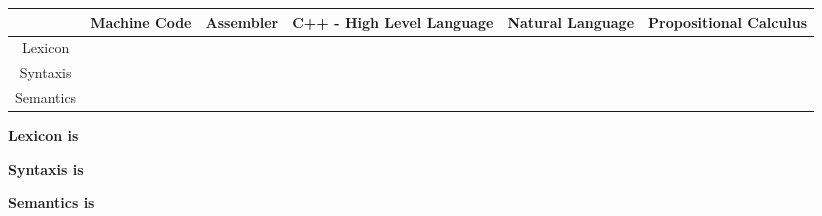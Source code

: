 \documentclass[a4paper,12pt]{scrartcl}
\begin{document}
  \begin{landscape}
    \thispagestyle{empty}
    \noindent
    \begin{tabularx}{\linewidth}{|c|X|X|X|X|X|}
      \hline
      & \textbf{Machine Code} & \textbf{Assembler} & \textbf{C++} - High Level Language & \textbf{Natural Language} & \textbf{Propositional Calculus} \\
      \hline
      Lexicon   & & & & & \rule{0pt}{25ex} \\
      \hline
      Syntaxis  & & & & & \rule{0pt}{25ex} \\
      \hline
      Semantics & & & & & \rule{0pt}{25ex} \\
      \hline
    \end{tabularx}

    \vspace{4ex}

    \textbf{Lexicon is}

    \textbf{Syntaxis is}

    \textbf{Semantics is}
  \end{landscape}
\end{document}

